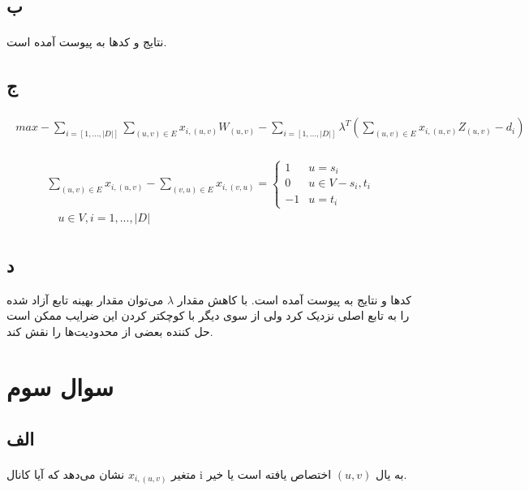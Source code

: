 \documentclass[paper=a4, fontsize=11pt]{article}
\numberwithin{equation}{section} %
\numberwithin{figure}{section} %
\numberwithin{table}{section} %
\begin{document}
\subsection{ب}
\paragraph{}
نتایج و کدها به پیوست آمده است.

\subsection{ج}
\begin{align}
\begin{split}
	max -\sum_{i = [1, ..., |D|]}\sum_{(u,v) \in E} x_{i,(u,v)}W_{(u,v)} - \sum_{i = [1, ..., |D|]}\lambda^T(\sum_{(u,v) \in E} x_{i,(u,v)}Z_{(u,v)} - d_i)
\end{split}
\end{align}

\begin{align}
\begin{split}
	\sum_{(u,v) \in E} x_{i,(u,v)} - \sum_{(v,u) \in E} x_{i,(v,u)} = 
	\left \{
		\begin{array}{cc}
			1 & u = s_i\\
			0 & u \in V - {s_i, t_i}\\
			-1 & u = t_i
		\end{array}
	\right.
	\\
	\quad u \in V, i = {1, ..., |D|}
\end{split}
\end{align}

\subsection{د}
کدها و نتایج به پیوست آمده است.
با کاهش مقدار $\lambda$ می‌توان مقدار بهینه تابع آزاد شده را
به تابع اصلی نزدیک کرد ولی از سوی دیگر با کوچکتر کردن این ضرایب
ممکن است حل کننده بعضی از محدودیت‌ها را نقش کند.

\section{سوال سوم}
\subsection{الف}
\paragraph{}
متغیر $x_{i,(u,v)}$ نشان می‌دهد که آیا کانال i به یال $(u,v)$
اختصاص یافته است یا خیر.
\end{document}
